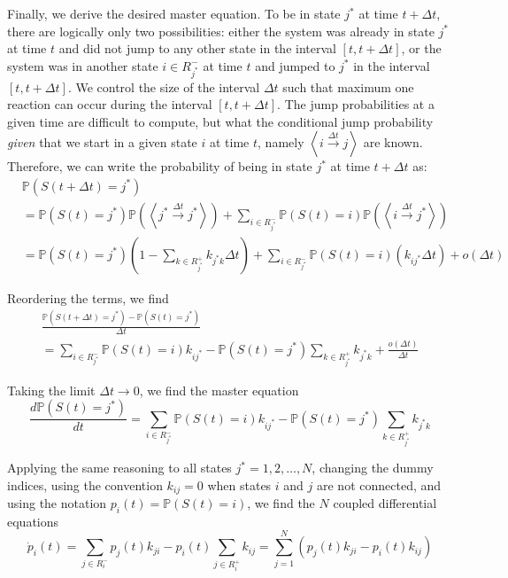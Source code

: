 \documentclass{article}
\theoremstyle{remark}
\begin{document}
    Finally, we derive the desired master equation. To be in state $j^*$ at time $t+\Delta t$, there are logically only two possibilities: either the system was already in state $j^*$ at time $t$ and did not jump to any other state in the interval $[t,t+\Delta t]$, or the system was in another state $i\in R_{j^*}^-$ at time $t$ and jumped to $j^*$ in the interval $[t,t+\Delta t]$. We control the size of the interval $\Delta t$ such that maximum one reaction can occur during the interval $[t,t+\Delta t]$. The jump probabilities at a given time are difficult to compute, but what the conditional jump probability \emph{given} that we start in a given state $i$ at time $t$, namely $\left<i\xrightarrow{\Delta t} j\right>$ are known. Therefore, we can write the probability of being in state $j^*$ at time $t+\Delta t$ as:
    \begin{equation}
    \begin{split}
        &\mathbb{P}(S(t+\Delta t)=j^*) \\
        &= \mathbb{P}(S(t)=j^*)\mathbb{P}(\left<j^*\xrightarrow{\Delta t}j^*\right>) + \sum_{i\in R_{j^*}^-}\mathbb{P}(S(t)=i)\mathbb{P}(\left<i\xrightarrow{\Delta t}j^*\right>) \\
        &= \mathbb{P}(S(t)=j^*)(1 - \sum_{k\in R_{j^*}^+}k_{j^*k}\Delta t) + \sum_{i\in R_{j^*}^-}\mathbb{P}(S(t)=i)(k_{ij^*}\Delta t) + o(\Delta t)
    \end{split}
    \end{equation}
    
    Reordering the terms, we find
    \begin{multline}
        \frac{\mathbb{P}(S(t+\Delta t)=j^*) - \mathbb{P}(S(t)=j^*)}{\Delta t} \\
        = \sum_{i\in R_{j^*}^-}\mathbb{P}(S(t)=i)k_{ij^*} - \mathbb{P}(S(t)=j^*)\sum_{k\in R_{j^*}^+}k_{j^*k} + \frac{o(\Delta t)}{\Delta t}
    \end{multline}
    
    Taking the limit $\Delta t\to 0$, we find the master equation
    \begin{equation}
        \frac{d\mathbb{P}(S(t)=j^*)}{dt} = \sum_{i\in R_{j^*}^-}\mathbb{P}(S(t)=i)k_{ij^*} - \mathbb{P}(S(t)=j^*)\sum_{k\in R_{j^*}^+}k_{j^*k}
    \end{equation}
    
    Applying the same reasoning to all states $j^*=1,2,\dots,N$, changing the dummy indices, using the convention $k_{ij}=0$ when states $i$ and $j$ are not connected, and using the notation $p_i(t) = \mathbb{P}(S(t)=i)$, we find the $N$ coupled differential equations
    \begin{equation}
        \dot{p}_i(t) = \sum_{j\in R_i^-}p_j(t)k_{ji} - p_i(t)\sum_{j\in R_i^+}k_{ij} = \sum_{j=1}^N \left(p_j(t)k_{ji} - p_i(t)k_{ij}\right)
    \end{equation}
\end{document}
